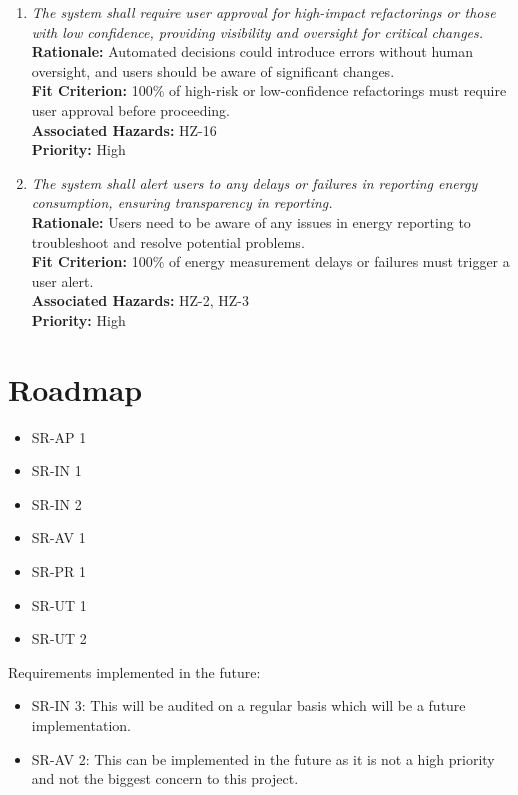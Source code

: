\documentclass{article}
\begin{document}
\begin{enumerate}[label=SCR \arabic*., wide=0pt, leftmargin=*]
    \item \emph{The system shall require user approval for high-impact refactorings or those with low confidence, providing visibility and oversight for critical changes.}\\
    {\bf Rationale:} Automated decisions could introduce errors without human oversight, and users should be aware of significant changes.\\
    {\bf Fit Criterion:} 100\% of high-risk or low-confidence refactorings must require user approval before proceeding.\\
    {\bf Associated Hazards:} HZ-16\\
    {\bf Priority:} High

    \item \emph{The system shall alert users to any delays or failures in reporting energy consumption, ensuring transparency in reporting.}\\
    {\bf Rationale:} Users need to be aware of any issues in energy reporting to troubleshoot and resolve potential problems.\\
    {\bf Fit Criterion:} 100\% of energy measurement delays or failures must trigger a user alert.\\
    {\bf Associated Hazards:} HZ-2, HZ-3\\
    {\bf Priority:} High

\end{enumerate}

\section{Roadmap}

\begin{itemize}
    \item SR-AP 1
    \item SR-IN 1
    \item SR-IN 2
    \item SR-AV 1
    \item SR-PR 1
    \item SR-UT 1
    \item SR-UT 2
\end{itemize}

Requirements implemented in the future:
\begin{itemize}
    \item SR-IN 3: This will be audited on a regular basis which will be a future implementation.
    \item SR-AV 2: This can be implemented in the future as it is not a high priority and not the biggest concern to this project.

\end{itemize}
\end{document}
